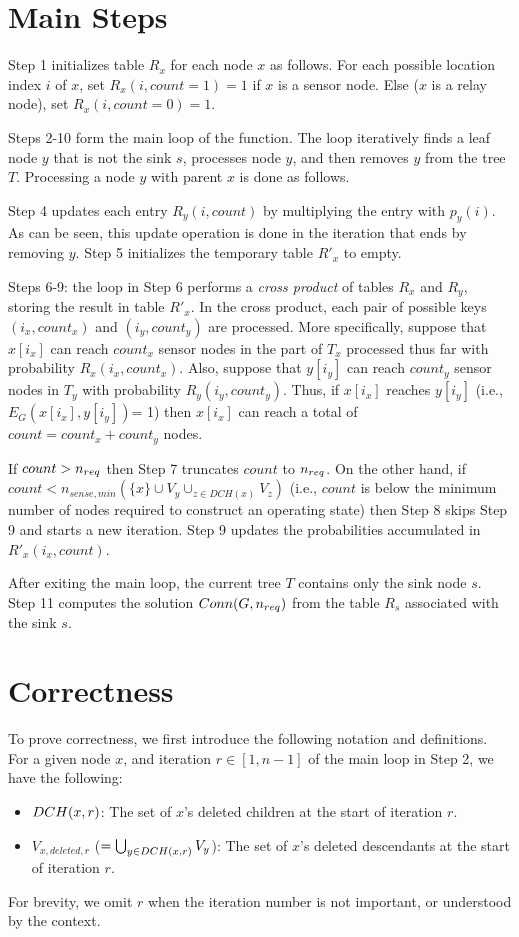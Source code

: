 \section{Main Steps}
Step 1 initializes table $R_x$ for each node $x$ as follows.
%
For each possible location index $i$ of $x$, set $R_x(i, count=1)= 1$
if $x$ is a sensor node.
Else ($x$ is a relay node), set $R_x(i, count=0)= 1$.
%


Steps 2-10 form the main loop of the function.
The loop iteratively finds a leaf node $y$ that is not the sink $s$, 
processes node $y$, and then removes $y$ from the tree $T$.
%
Processing a node $y$ with parent $x$ is done as follows.

Step 4 updates each entry $R_y (i,count)$ by multiplying the entry
with $p_y(i)$.
%
As can be seen, this update operation is done in the iteration that ends by
removing $y$.
%
Step 5 initializes the temporary table $R'_x$ to empty.


Steps 6-9: the loop in Step 6 performs a {\em cross product} of tables
$R_x$ and $R_y$, storing the result in table $R'_x$.
%
In the cross product, each pair of possible keys $(i_x, count_x)$
and $(i_y, count_y)$ are processed.
%
More specifically, suppose that $x[i_x]$ can reach $count_x$ sensor nodes
in the part of $T_x$ processed thus far with probability $R_x(i_x,count_x)$.
%
Also, suppose that $y[i_y]$ can reach $count_y$ sensor nodes
in $T_y$ with probability $R_y(i_y,count_y)$.
%
Thus, if $x[i_x]$ reaches $y[i_y]$ (i.e., $E_G(x[i_x],y[i_y])$= 1)
then $x[i_x]$ can reach a total of $count= count_x + count_y$ nodes.


If $count > {n_{req}}$ then Step 7 truncates $count$ to ${n_{req}}$.
%
On the other hand, if $count < n_{sense,min}(\{x\}\cup V_y  \cup_{z\in DCH(x)} V_z)$ (i.e., $count$ is below the
minimum number of nodes required to construct an operating state) then
Step 8 skips Step 9 and starts a new iteration.
%
Step 9 updates the probabilities accumulated in $R'_x(i_x,count)$. 


After exiting the main loop, the current tree $T$ contains only the
sink node $s$. Step 11 computes the solution $Conn(G,{n_{req}})$ from
the table $R_s$ associated with the sink $s$.

\section{Correctness}

To prove correctness, we first introduce the following notation and
definitions.
%
For a given node $x$, and iteration $r \in [1,n-1]$ of the main loop
in Step 2, we have the following:
%
\begin{itemize}
\item	${DCH} (x,r)$:
	The set of $x$'s deleted children at the start of iteration $r$.

\item	$V_{x,deleted,r}$ ($= \bigcup_{y \in {DCH}(x,r)} V_y$):
	The set of $x$'s deleted descendants at the start of iteration $r$.
\end{itemize}
%
For brevity, we omit $r$ when the iteration number is not important, or
understood by the context.


